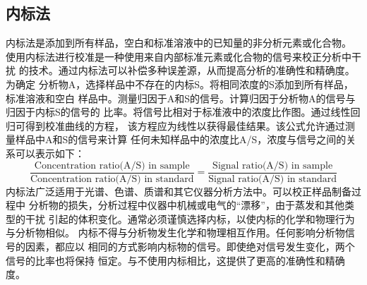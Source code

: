 \subsection{内标法}
内标法是添加到所有样品，空白和标准溶液中的已知量的非分析元素或化合物。
使用内标法进行校准是一种使用来自内部标准元素或化合物的信号来校正分析中干扰
的技术。通过内标法可以补偿多种误差源，从而提高分析的准确性和精确度。为确定
分析物A，选择样品中不存在的内标S。将相同浓度的S添加到所有样品，标准溶液和空白
样品中。测量归因于A和S的信号。计算归因于分析物A的信号与归因于内标S的信号的
比率。将信号比相对于标准液中的浓度比作图。通过线性回归可得到校准曲线的方程，
该方程应为线性以获得最佳结果。该公式允许通过测量样品中A和S的信号来计算
任何未知样品中的浓度比A/S，浓度与信号之间的关系可以表示如下：
\[
    \frac{\text{Concentration ratio(A/S) in sample}}
    {\text{Concentration ratio(A/S) in standard}} =
    \frac{\text{Signal ratio(A/S) in sample}}
    {\text{Signal ratio(A/S) in standard}}
\]
内标法广泛适用于光谱、色谱、质谱和其它仪器分析方法中。可以校正样品制备过程中
分析物的损失，分析过程中仪器中机械或电气的“漂移”，由于蒸发和其他类型的干扰
引起的体积变化。通常必须谨慎选择内标，以使内标的化学和物理行为与分析物相似。
内标不得与分析物发生化学和物理相互作用。任何影响分析物信号的因素，都应以
相同的方式影响内标物的信号。即使绝对信号发生变化，两个信号的比率也将保持
恒定。与不使用内标相比，这提供了更高的准确性和精确度。

